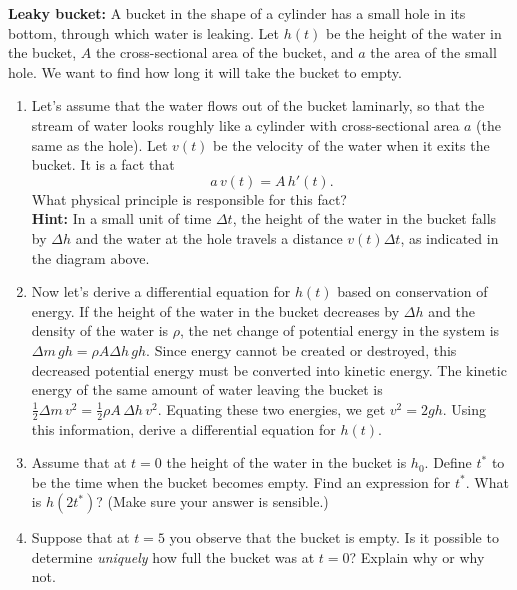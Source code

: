 \documentclass[12pt,letterpaper]{hmcpset}
\begin{document}
\begin{problem}[1]
  {\textbf{Leaky bucket:} A bucket in the shape of a cylinder has a
  small hole in its bottom, through which water is leaking. Let $h(t)$ be the height
  of the water in the bucket, $A$ the
  cross-sectional area of the bucket, and $a$ the area of the small
  hole. We want to find how long it will take the bucket to
  empty.}
\begin{enumerate}
\item Let's assume that the water flows out of the
    bucket laminarly, so that the stream of water looks roughly like a
    cylinder with cross-sectional area $a$ (the same as the hole). Let
    $v(t)$ be the velocity of the water when it exits the bucket. It
    is a fact that
\[
a\,v(t)=A\,h'(t).
\]
What physical principle is responsible for this fact? \\
\textbf{Hint:} In a small unit of time $\Delta t$, the height of the
water in the bucket falls by $\Delta h$ and the water at the hole
travels a distance $v(t)\Delta t$, as indicated in the diagram above.
\item Now let's derive a differential equation for $h(t)$ based on
  conservation of energy. If the height of the water in the bucket
  decreases by $\Delta h$ and the density of the water is $\rho$, the
  net change of potential energy in the system is $\Delta m\, gh=\rho
  A\Delta h\, gh$. Since energy cannot be created or destroyed,
  this decreased potential energy must be converted into kinetic energy.
  The kinetic energy of the same amount of water leaving the bucket is
  $\tfrac{1}{2} \Delta m\, v^2=\tfrac{1}{2}\rho A\, \Delta h\, v^2$.
  Equating these two energies, we get $v^2=2gh$. Using this
  information, derive a differential equation for $h(t)$.
\item Assume that at $t=0$ the height of the water in the bucket is
  $h_0$. Define $t^{\ast}$ to be the time when the bucket becomes
  empty. Find an expression for $t^{\ast}$.  What is $h(2t^{\ast})$?
  (Make sure your answer is sensible.)\newpage
\item Suppose that at $t=5$ you observe that the bucket is empty. Is
  it possible to determine \textit{uniquely} how full the bucket was
  at $t=0$? Explain why or why not.
\end{enumerate}
\end{problem}
\newpage
\begin{solution}
  \vfill
\end{solution}
\newpage
\end{document}
